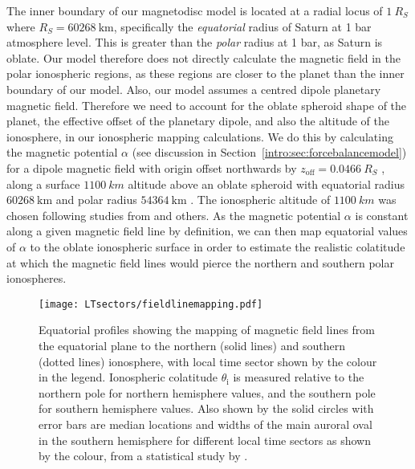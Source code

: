 The inner boundary of our magnetodisc model is located at a radial locus of $\SI{1}{R_S}$ where $\si{R_S}=\SI{60268}{\km}$, specifically the \textit{equatorial} radius of Saturn at 1 bar atmosphere level. This is greater than the \textit{polar} radius at 1 bar, as Saturn is oblate. Our model therefore does not directly calculate the magnetic field in the polar ionospheric regions, as these regions are closer to the planet than the inner boundary of our model. Also, our model assumes a centred dipole planetary magnetic field. Therefore we need to account for the oblate spheroid shape of the planet, the effective offset of the planetary dipole, and also the altitude of the ionosphere, in our ionospheric mapping calculations. We do this by calculating the magnetic potential $\alpha$ (see discussion in Section~\ref{intro:sec:forcebalancemodel}) for a dipole magnetic field with origin offset northwards by $z_\mathrm{off}=\SI{0.0466}{R_S}$ \citep{dougherty2018}, along a surface $\SI{1100}{km}$ altitude above an oblate spheroid with equatorial radius $\SI{60268}{\km}$ and polar radius $\SI{54364}{\km}$ \citep{seidelmann2007}. The ionospheric altitude of $\SI{1100}{km}$ was chosen following studies from \citet{gerard2009,stallard2012} and others. As the magnetic potential $\alpha$ is constant along a given magnetic field line by definition, we can then map equatorial values of $\alpha$ to the oblate ionospheric surface in order to estimate the realistic colatitude at which the magnetic field lines would pierce the northern and southern polar ionospheres.

\begin{figure}
\centering
\texttt{[image: LTsectors/fieldlinemapping.pdf]}
\caption[Model equatorial profiles of field line mappings from the equator to the ionosphere, for different local time sectors, for the compressed and expanded regimes.]{Equatorial profiles showing the mapping of magnetic field lines from the equatorial plane to the northern (solid lines) and southern (dotted lines) ionosphere, with local time sector shown by the colour in the legend. Ionospheric colatitude $\theta_\mathrm{i}$ is measured relative to the northern pole for northern hemisphere values, and the southern pole for southern hemisphere values. Also shown by the solid circles with error bars are median locations and widths of the main auroral oval in the southern hemisphere for different local time sectors as shown by the colour, from a statistical study by \citet{badman2006}.}
\label{LTsectors:fig:fieldlinemapping}
\end{figure}

